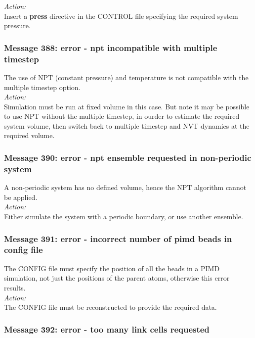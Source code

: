 \noindent
{\em Action:}\\
Insert a {\bf press} directive in the CONTROL file specifying the
required system pressure.

\subsubsection*{Message 388: error - npt incompatible with multiple timestep}

The use of NPT (constant pressure) and temperature is not compatible
with the multiple timestep option.\\

\noindent
{\em Action:}\\
Simulation must be run at fixed volume in this case. But note it may
be possible to use NPT without the multiple timestep, in ourder to
estimate the required system volume, then switch back to multiple
timestep and NVT dynamics at the required volume.

\subsubsection*{Message 390: error - npt ensemble requested in
non-periodic system}

A non-periodic system has no defined volume, hence the NPT algorithm
cannot be applied.\\

\noindent
{\em Action:} \\ Either simulate the system with a periodic boundary,
or use another ensemble.

\subsubsection*{Message 391: error - incorrect number of pimd beads in config file}

The CONFIG file must specify the position of all the beads in a PIMD
simulation, not just the positions of the parent atoms, otherwise this
error results. \\

\noindent
{\em Action:}\\
The CONFIG file must be reconstructed to provide the required data.

\subsubsection*{Message 392: error - too many link cells requested}

